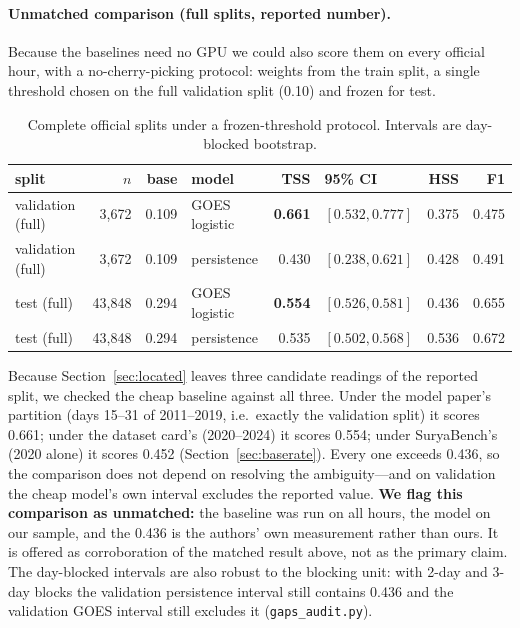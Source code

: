 \documentclass[11pt]{article}
\newcommand{\code}[1]{\texttt{#1}}
\begin{document}
\paragraph{Unmatched comparison (full splits, reported number).} Because the
baselines need no GPU we could also score them on every official hour, with a
no-cherry-picking protocol: weights from the train split, a single threshold
chosen on the full validation split (0.10) and frozen for test.

\begin{table}[htbp]
\centering
\caption{Complete official splits under a frozen-threshold protocol. Intervals
are day-blocked bootstrap.}
\begin{tabular}{lrrlrlrr}
\toprule
split & $n$ & base & model & TSS & 95\% CI & HSS & F1 \\
\midrule
validation (full) & 3{,}672 & 0.109 & GOES logistic & \textbf{0.661} & $[0.532, 0.777]$ & 0.375 & 0.475 \\
validation (full) & 3{,}672 & 0.109 & persistence & 0.430 & $[0.238, 0.621]$ & 0.428 & 0.491 \\
test (full) & 43{,}848 & 0.294 & GOES logistic & \textbf{0.554} & $[0.526, 0.581]$ & 0.436 & 0.655 \\
test (full) & 43{,}848 & 0.294 & persistence & 0.535 & $[0.502, 0.568]$ & 0.536 & 0.672 \\
\bottomrule
\end{tabular}
\end{table}

Because Section~\ref{sec:located} leaves three candidate readings of the reported
split, we checked the cheap baseline against all three. Under the model paper's
partition (days 15--31 of 2011--2019, i.e.\ exactly the validation split) it
scores 0.661; under the dataset card's (2020--2024) it scores 0.554; under
SuryaBench's (2020 alone) it scores 0.452 (Section~\ref{sec:baserate}). Every one
exceeds 0.436, so the comparison does not depend on resolving the ambiguity---and
on validation the cheap model's own interval excludes the reported value.
\textbf{We flag this comparison as unmatched:} the baseline was run on all hours,
the model on our sample, and the 0.436 is the authors' own measurement rather
than ours. It is offered as corroboration of the matched result above, not as the
primary claim. The day-blocked intervals are also robust to the blocking unit:
with 2-day and 3-day blocks the validation persistence interval still contains
0.436 and the validation GOES interval still excludes it
(\code{gaps\_audit.py}).
\end{document}
